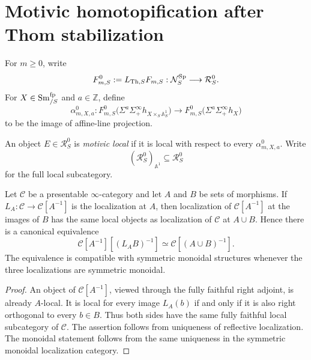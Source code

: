 \section{Motivic homotopification after Thom stabilization}
\label{sec:infinitesimal-bnv-adjoint-triple}

For \(m\geq0\), write
\[
  F^0_{m,S}:=L_{\mathrm{Th},S}F_{m,S}:
  \mathcal N_S^{\mathrm{Sp}}\longrightarrow\mathcal R_S^0.
\]
For \(X\in\operatorname{Sm}^{\mathrm{fp}}_{/S}\) and \(a\in\mathbb Z\), define
\[
  \alpha^0_{m,X,a}:
  F^0_{m,S}
  \bigl(\Sigma^a\Sigma^\infty_+h_{X\times_S\mathbb A^1_S}\bigr)
  \longrightarrow
  F^0_{m,S}
  \bigl(\Sigma^a\Sigma^\infty_+h_X\bigr)
\]
to be the image of affine-line projection.

\begin{definition}
\label{def:infinitesimal-motivic-local-raw}
An object \(E\in\mathcal R_S^0\) is \emph{motivic local} if it is local with
respect to every \(\alpha^0_{m,X,a}\).  Write
\[
  (\mathcal R_S^0)_{\mathbb A^1}
  \subseteq
  \mathcal R_S^0
\]
for the full local subcategory.
\end{definition}

\begin{lemma}
\label{lem:infinitesimal-successive-localizations}
Let \(\mathcal C\) be a presentable \(\infty\)-category and let \(A\) and \(B\)
be sets of morphisms.  If \(L_A:\mathcal C\to\mathcal C[A^{-1}]\) is the
localization at \(A\), then localization of \(\mathcal C[A^{-1}]\) at the images
of \(B\) has the same local objects as localization of \(\mathcal C\) at
\(A\cup B\).  Hence there is a canonical equivalence
\[
  \mathcal C[A^{-1}][(L_AB)^{-1}]
  \simeq
  \mathcal C[(A\cup B)^{-1}].
\]
The equivalence is compatible with symmetric monoidal structures whenever the
three localizations are symmetric monoidal.
\end{lemma}

\begin{proof}
An object of \(\mathcal C[A^{-1}]\), viewed through the fully faithful right
adjoint, is already \(A\)-local.  It is local for every image \(L_A(b)\) if and
only if it is also right orthogonal to every \(b\in B\).  Thus both sides have
the same fully faithful local subcategory of \(\mathcal C\).  The assertion
follows from uniqueness of reflective localization.  The monoidal statement
follows from the same uniqueness in the symmetric monoidal localization
category.
\end{proof}


